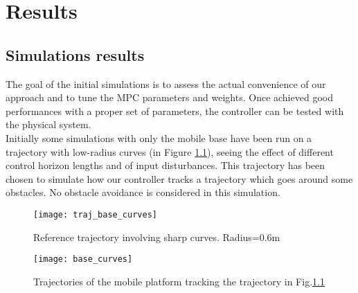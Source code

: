 
\chapter{Results}
\label{chapter7}
\section{Simulations results}
The goal of the initial simulations is to assess the actual convenience of our approach and to tune the MPC parameters and weights. Once achieved good performances with a proper set of parameters, the controller can be tested with the physical system.\\
Initially some simulations with only the mobile base have been run on a trajectory with low-radius curves (in Figure \ref{traj_base_curves}), seeing the effect of different control horizon lengths and of input disturbances. This trajectory has been chosen to simulate how our controller tracks a trajectory which goes around some obstacles. No obstacle avoidance is considered in this simulation.
\begin{figure}%
	\centering
	\texttt{[image: traj\_base\_curves]}
	\caption{Reference trajectory involving sharp curves. Radius=0.6m}
	\label{traj_base_curves}
\end{figure}
\begin{figure}
	\centering
	\texttt{[image: base\_curves]}
	\caption{Trajectories of the mobile platform tracking the trajectory in Fig.\ref{traj_base_curves}}
	\label{base_curves}
\end{figure}

